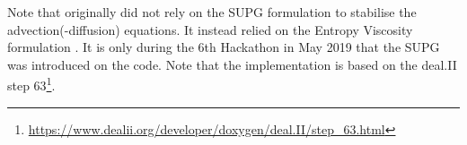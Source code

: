 \begin{remark}
Note that \aspect{} originally did not rely on the SUPG formulation to stabilise the 
advection(-diffusion) equations\cite{krhb12}. It instead relied on the Entropy Viscosity
formulation \cite{gupp11}.
It is only during the 6th Hackathon in May 2019 that the SUPG was introduced on the code.
Note that the \aspect{} implementation is based on the deal.II step 
63\footnote{\url{https://www.dealii.org/developer/doxygen/deal.II/step_63.html}}.
\end{remark}
